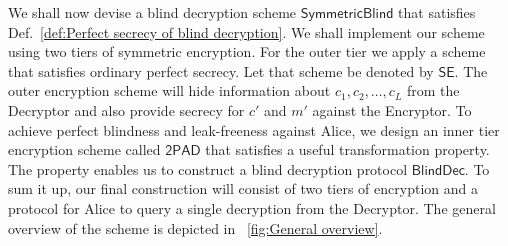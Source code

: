 \documentclass[10pt,journal]{IEEEtran}
\newcommand{\sch}[1]{\mathsf{#1}}
\begin{document}
We shall now devise a blind decryption scheme $\sch{SymmetricBlind}$
that satisfies Def.~\ref{def:Perfect secrecy of blind decryption}.
We shall implement our scheme using two tiers of symmetric encryption.
For the outer tier we apply a scheme that satisfies
ordinary perfect secrecy.
Let that scheme be denoted by $\sch{SE}$.
The outer encryption scheme will
hide information about $c_1,c_2,\ldots,c_L$ from the Decryptor and
also provide secrecy for $c'$ and $m'$ against the Encryptor. To achieve perfect blindness
and leak-freeness against Alice, we
design an inner tier encryption scheme called $\sch{2PAD}$ that 
satisfies a useful transformation property. The property enables us to construct a blind
decryption protocol $\sch{BlindDec}$.
To sum it up, our final construction
will consist of two tiers of encryption and a protocol for Alice to query a single decryption
from the Decryptor. The general overview of the scheme is depicted in \figurename~\ref{fig:General overview}.
\end{document}
